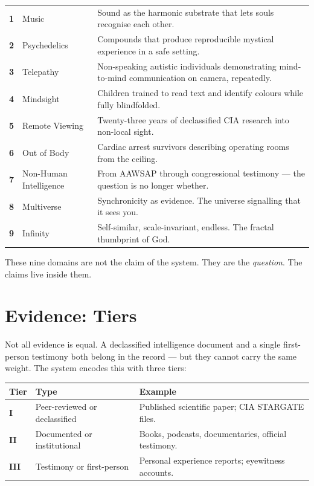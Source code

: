 \documentclass[11pt,a4paper]{article}
\begin{document}
\begin{plainbox}
\begin{tabular}{@{}p{0.4cm} p{4.2cm} p{9cm}@{}}
\textbf{1} & Music                   & Sound as the harmonic substrate that lets souls recognise each other. \\
\textbf{2} & Psychedelics            & Compounds that produce reproducible mystical experience in a safe setting. \\
\textbf{3} & Telepathy               & Non-speaking autistic individuals demonstrating mind-to-mind communication on camera, repeatedly. \\
\textbf{4} & Mindsight               & Children trained to read text and identify colours while fully blindfolded. \\
\textbf{5} & Remote Viewing          & Twenty-three years of declassified CIA research into non-local sight. \\
\textbf{6} & Out of Body             & Cardiac arrest survivors describing operating rooms from the ceiling. \\
\textbf{7} & Non-Human Intelligence  & From AAWSAP through congressional testimony --- the question is no longer whether. \\
\textbf{8} & Multiverse              & Synchronicity as evidence. The universe signalling that it sees you. \\
\textbf{9} & Infinity                & Self-similar, scale-invariant, endless. The fractal thumbprint of God. \\
\end{tabular}
\end{plainbox}

These nine domains are not the claim of the system. They are the
\emph{question}. The claims live inside them.

\section{Evidence: Tiers}

Not all evidence is equal. A declassified intelligence document and
a single first-person testimony both belong in the record --- but
they cannot carry the same weight. The system encodes this with three
tiers:

\begin{plainbox}
\begin{tabular}{@{}p{1.4cm} p{4.8cm} p{8cm}@{}}
\textbf{Tier} & \textbf{Type} & \textbf{Example} \\
\midrule
\textbf{I}    & Peer-reviewed or declassified & Published scientific paper; CIA STARGATE files. \\
\textbf{II}   & Documented or institutional   & Books, podcasts, documentaries, official testimony. \\
\textbf{III}  & Testimony or first-person     & Personal experience reports; eyewitness accounts. \\
\end{tabular}
\end{plainbox}
\end{document}
